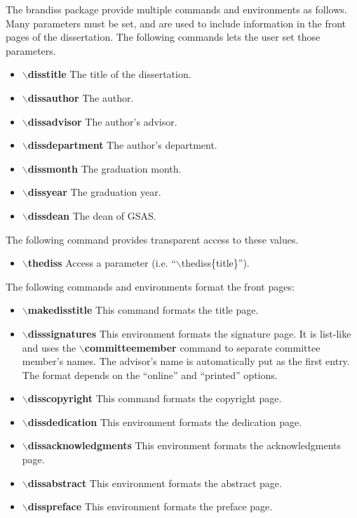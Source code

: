 \documentclass[12pt]{article}
\begin{document}
The brandiss package provide multiple commands and environments as
follows.  Many parameters must be set, and are used to include
information in the front pages of the dissertation.  The following
commands lets the user set those parameters.
\begin{itemize}
\item\textbf{$\backslash$disstitle} The title of the dissertation.
\item\textbf{$\backslash$dissauthor} The author.
\item\textbf{$\backslash$dissadvisor} The author's advisor.
\item\textbf{$\backslash$dissdepartment} The author's department.
\item\textbf{$\backslash$dissmonth} The graduation month.
\item\textbf{$\backslash$dissyear} The graduation year.
\item\textbf{$\backslash$dissdean} The dean of GSAS.
\end{itemize}
The following command provides transparent access to these values.
\begin{itemize}
\item\textbf{$\backslash$thediss} Access a parameter
  (i.e. ``$\backslash$thediss\{title\}'').
\end{itemize}
The following commands and environments format the front pages:
\begin{itemize}
\item\textbf{$\backslash$makedisstitle} This command formats the title
  page.
\item\textbf{$\backslash$disssignatures} This environment formats the
  signature page.  It is list-like and uses the
  \textbf{$\backslash$committeemember} command to separate committee
  member's names.  The advisor's name is automatically put as the
  first entry.  The format depends on the ``online'' and ``printed''
  options.
\item\textbf{$\backslash$disscopyright} This command formats the
  copyright page.
\item\textbf{$\backslash$dissdedication} This environment formats the
  dedication page.
\item\textbf{$\backslash$dissacknowledgments} This environment formats
  the acknowledgments page.
\item\textbf{$\backslash$dissabstract} This environment formats the
  abstract page.
\item\textbf{$\backslash$disspreface} This environment formats the
  preface page.
\end{itemize}
\end{document}
